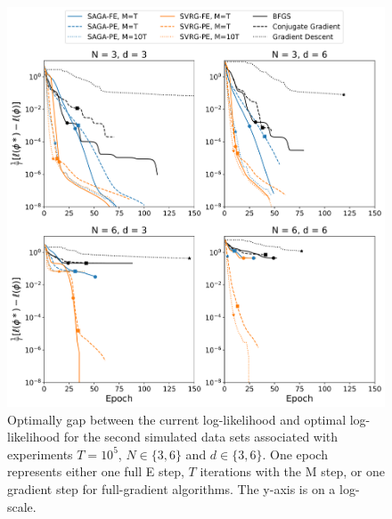 \documentclass[12pt]{article}
\begin{document}
\begin{figure}[H]
    \centering
    \includegraphics[width=6.5in]{../plt/log-like_v_epoch_T-100000-001.png}
    \caption{Optimally gap between the current log-likelihood and optimal log-likelihood for the second simulated data sets associated with experiments $T=10^{5}$, $N \in \{3,6\}$ and $d \in \{3,6\}$. One epoch represents either one full E step, $T$ iterations with the M step, or one gradient step for full-gradient algorithms. The y-axis is on a log-scale.}
\end{figure}
%
\end{document}
